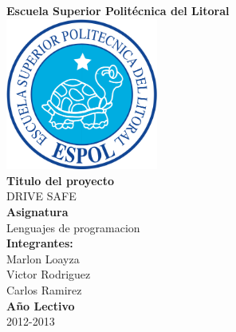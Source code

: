 \documentclass[a4paper]{article}						%
\begin{document}

	\begin{center}
		\vspace{1cm}
		\textbf{\huge{Escuela Superior Politécnica del Litoral}}\\
		\vspace{0.5cm}
		\includegraphics[width=5cm]{espol.png} \\
		\vspace{1cm}
		\textbf{\large{Titulo del proyecto}}\\
		\vspace{0.5cm}
		\Large{DRIVE SAFE}\\
		\vspace{1cm}
		\textbf{Asignatura}\\
		\vspace{0.5cm}
		Lenguajes de programacion\\	
		\vspace{1cm}	
		\textbf{\large{Integrantes:}}\\
		\vspace{1cm}
		Marlon Loayza\\
		\vspace{0.3cm}
		Victor Rodriguez\\
		\vspace{0.3cm}
		Carlos Ramirez\\
		\vspace{1cm}
		\textbf{Año Lectivo}\\
		\vspace{0.5cm}
		2012-2013
		\end{center}
		\newpage
	
\end{document}
